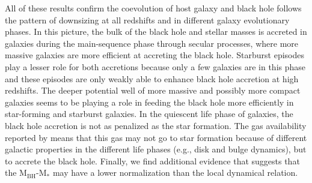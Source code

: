    All of these results confirm the coevolution of host galaxy and black hole follows the pattern of downsizing at all redshifts and in different galaxy evolutionary phases. In this picture, the bulk of the black hole and stellar masses is accreted in galaxies during the main-sequence phase through secular processes, where more massive galaxies are more efficient at accreting the black hole. Starburst episodes play a lesser role for both accretions because only a few galaxies are in this phase and these episodes are only weakly able to enhance black hole accretion at high redshifts. 
   The deeper potential well of more massive and possibly more compact galaxies seems to be playing a role in feeding the black hole more efficiently in star-forming and starburst galaxies.
   In the quiescent life phase of galaxies, the black hole accretion is not as penalized as the star formation. The gas availability reported by \citet{2018NatAs...2..239G} means that this gas may not go to star formation because of different galactic properties in the different life phases (e.g., disk and bulge dynamics), but to accrete the black hole.
   Finally, we find additional evidence that suggests that the M$_\text{BH}$-M$_*$ may have a lower normalization than the local dynamical relation.


